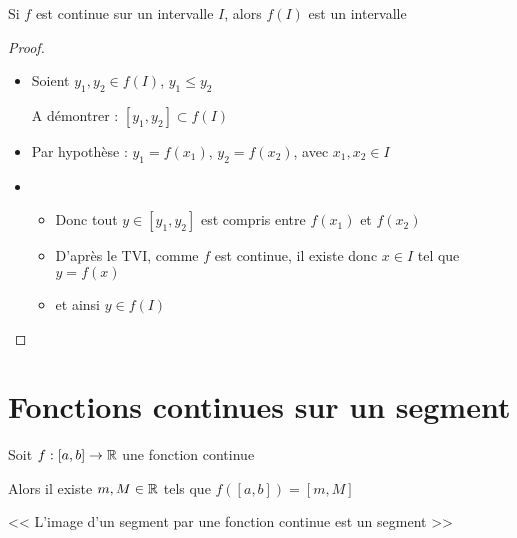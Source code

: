 \begin{frame}

\begin{corollaire}
Si $f$ est continue sur un intervalle $I$, alors $f(I)$ est un intervalle
\end{corollaire}

\begin{proof}
\begin{itemize}
\item\pause Soient $y_1,y_2\in f(I)$, $y_1\leq y_2$

A démontrer :  $[y_1,y_2]\subset f(I)$

\item\pause Par hypothèse :  $y_1 =f(x_1)$, $y_2 =f(x_2)$, avec $x_1,x_2\in I$

\item\pause 
  \begin{itemize}
    \item Donc tout $y\in [y_1,y_2]$ est compris entre $f(x_1)$ et $f(x_2)$
\pause    
    \item D'après le TVI, comme $f$ est continue, il existe donc $x\in I$ tel que $y=f(x)$
\pause    
    \item et ainsi $y\in f(I)$
  \end{itemize}
\end{itemize}
\end{proof}
  
\end{frame}




\section{Fonctions continues sur un segment}

\begin{frame}

\begin{theoreme}
Soit $f:[a,b]\to\mathbb{R}$ une fonction continue

 
Alors il existe $m, M\in \mathbb{R}$ tels que $f([a,b])=[m,M]$ 
\end{theoreme}
\pause
\medskip


\begin{minipage}{0.5\textwidth}
\end{minipage} \pause
\begin{minipage}{0.49\textwidth}
<< L'image d'un segment par une fonction continue est un segment >>  
\end{minipage}



\pause
\vspace{.3cm}
\vspace{-.2cm}

\end{frame}

